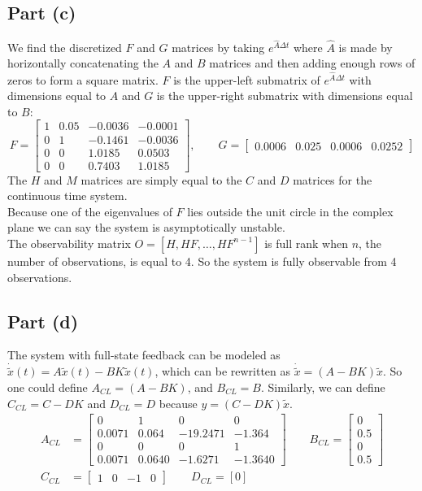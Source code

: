 \documentclass[11pt]{article}
\begin{document}
\subsection*{Part (c)}
We find the discretized $F$ and $G$ matrices by taking $e^{\hat{A}\Delta t}$ where $\hat{A}$ is made by horizontally concatenating the $A$ and $B$ matrices and then adding enough rows of zeros to form a square matrix. $F$ is the upper-left submatrix of $e^{\hat{A}\Delta t}$ with dimensions equal to $A$ and $G$ is the upper-right submatrix with dimensions equal to $B$:
\begin{equation*}
	F = \begin{bmatrix} 1 & 0.05 & -0.0036 & -0.0001 \\
						0 & 1 & -0.1461 & -0.0036 \\
						0 & 0 & 1.0185 & 0.0503 \\
						0 & 0 & 0.7403 & 1.0185 \end{bmatrix},\qquad
	G = \begin{bmatrix} 0.0006 & 0.025 & 0.0006 & 0.0252 \end{bmatrix}
\end{equation*}
The $H$ and $M$ matrices are simply equal to the $C$ and $D$ matrices for the continuous time system. \\
Because one of the eigenvalues of $F$ lies outside the unit circle in the complex plane we can say the system is asymptotically unstable. \\
The observability matrix $O = [H, HF, \dots, HF^{n-1}]$ is full rank when $n$, the number of observations, is equal to 4. So the system is fully observable from 4 observations.

\subsection*{Part (d)}
The system with full-state feedback can be modeled as $\dot{\tilde{x}}(t)=A\tilde{x}(t)-BK\tilde{x}(t)$, which can be rewritten as $\dot{\tilde{x}}=(A-BK)\tilde{x}$. So one could define $A_{CL}=(A-BK)$, and $B_{CL}=B$. Similarly, we can define $C_{CL}=C-DK$ and $D_{CL}=D$ because $y=(C-DK)\tilde{x}$.
\begin{align*}
	A_{CL}&= \begin{bmatrix} 0 & 1 & 0 & 0 \\ 
							 0.0071 & 0.064 & -19.2471 & -1.364 \\
							 0 & 0 & 0 & 1 \\
							 0.0071 & 0.0640 & -1.6271 & -1.3640 \end{bmatrix}\qquad
	B_{CL} = \begin{bmatrix} 0 \\ 0.5 \\ 0 \\ 0.5 \end{bmatrix} \\
	C_{CL}&= \begin{bmatrix} 1 & 0 & -1 & 0 \end{bmatrix}\qquad
	D_{CL} = [0]
\end{align*}
\end{document}
